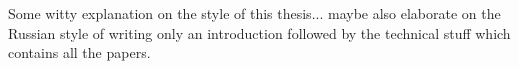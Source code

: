 Some witty explanation on the style of this thesis...  maybe also elaborate on
the Russian style of writing only an introduction followed by the technical
stuff which contains all the papers.